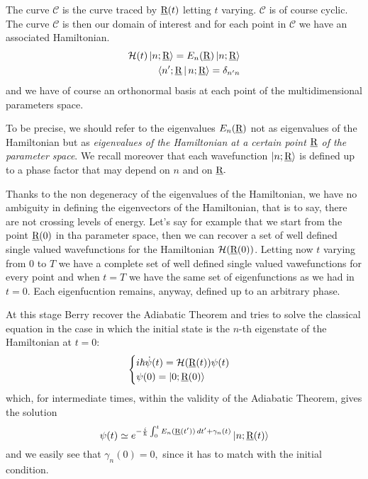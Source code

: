 The curve $ \mathcal{C} $ is the curve traced by $ \underline{\textrm{R}}(t) $ letting $ t $ varying. $ \mathcal{C} $ is of course cyclic.
The curve $ \mathcal{C} $ is then our domain of interest and for each point in $ \mathcal{C} $ we have an associated Hamiltonian.
\begin{align}
\mathcal{H}(t)\Ket{n;\underline{\textrm{R}}}=E_n(\underline{\textrm{R}})\Ket{n;\underline{\textrm{R}}}\\
\Braket{n';\underline{\textrm{R}}|n;\underline{\textrm{R}}}=\delta_{n'n}
\end{align}
and we have of course an orthonormal basis at each point of the multidimensional parameters space.
\begin{rem}
	To be precise, we should refer to the eigenvalues $ E_{n}(\underline{\textrm{R}}) $ not as eigenvalues of the Hamiltonian but as \emph{eigenvalues of the Hamiltonian at a certain point $ \underline{\textrm{R}} $ of the parameter space}. We recall moreover that each wavefunction $ \Ket{n;\underline{\textrm{R}}} $ is defined up to a phase factor that may depend on $ n $ and on $ \underline{\textrm{R}}. $ 
\end{rem}
\begin{rem}
	Thanks to the non degeneracy of the eigenvalues of the Hamiltonian, we have no ambiguity in defining the eigenvectors of the Hamiltonian, that is to say, there are not crossing levels of energy. Let's say for example that we start from the point $ \underline{\textrm{R}}(0) $ in tha parameter space, then we can recover a set of well defined single valued wavefunctions for the Hamiltonian $ \mathcal{H}(\underline{\textrm{R}}(0)) $. Letting now $ t $ varying from $ 0 $ to $ T $ we have a complete set of well defined single valued vawefunctions for every point and when $ t=T $ we have the same set of eigenfunctions as we had in $ t=0. $ Each eigenfucntion remains, anyway, defined up to an arbitrary phase. 
\end{rem}

At this stage Berry recover the Adiabatic Theorem and tries to solve the classical \Sch equation in the case in which the initial state is the $ n $-th eigenstate of the Hamiltonian at $ t=0 $:
\begin{equation}
\begin{cases}
i\hbar\dot{\psi}(t)=\mathcal{H}(\underline{\textrm{R}}(t))\psi(t)\\
\psi(0)=\Ket{0;\underline{\textrm{R}}(0)}
\end{cases}
\end{equation}
which, for intermediate times, within the validity of the Adiabatic Theorem, gives the solution
\begin{equation}
\psi(t)\simeq e^{-\frac{i}{\hbar}\int_{0}^{t}E_n(\underline{\textrm{R}}(t'))\mathop{}\!d t'+\gamma_n(t)}\Ket{n;\underline{\textrm{R}}(t)}
\label{eq:gen_solution}
\end{equation}
and we easily see that $ \gamma_n(0)=0, $ since it has to match with the initial condition.

